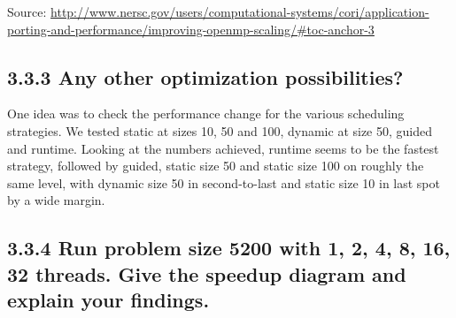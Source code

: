 Source: \url{http://www.nersc.gov/users/computational-systems/cori/application-porting-and-performance/improving-openmp-scaling/#toc-anchor-3}


\subsection*{3.3.3 Any other optimization possibilities?}
One idea was to check the performance change for the various scheduling strategies. We tested static at sizes 10, 50 and 100, dynamic at size 50, guided and runtime.
Looking at the numbers achieved, runtime seems to be the fastest strategy, followed by guided, static size 50 and static size 100 on roughly the same level, with dynamic size 50 in second-to-last and static size 10 in last spot by a wide margin. 



\subsection*{3.3.4 Run problem size 5200 with 1, 2, 4, 8, 16, 32 threads. Give the speedup diagram and explain your findings.}
